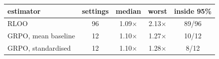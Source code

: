 \footnotesize
\setlength{\tabcolsep}{3pt}
\begin{tabular}{@{}lcccc@{}}
\toprule
estimator & settings & median & worst & inside 95\% \\
\midrule
RLOO & 96 & 1.09$\times$ & 2.13$\times$ & 89/96 \\
GRPO, mean baseline & 12 & 1.10$\times$ & 1.27$\times$ & 10/12 \\
GRPO, standardised & 12 & 1.10$\times$ & 1.28$\times$ & 8/12 \\
\bottomrule
\end{tabular}